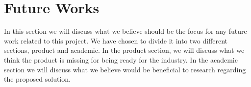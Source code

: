 \chapter{Future Works}
In this section we will discuss what we believe should be the focus for any future work related to this project.
We have chosen to divide it into two different sections, product and academic.
In the product section, we will discuss what we think the product is missing for being ready for the industry.
In the academic section we will discuss what we believe would be beneficial to research regarding the proposed solution.


